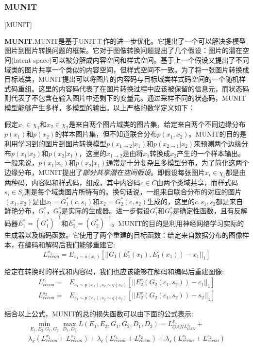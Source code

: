 
\subsubsection{MUNIT}[MUNIT]

\textbf{MUNIT.}\cite{MUNIT}\quad MUNIT是基于UNIT\cite{UNIT}工作的进一步优化。它提出了一个可以解决多模型图片到图片转换问题的框架。它对于图像转换问题提出了几个假设：图片的潜在空间(latent space)可以被分解成内容空间和样式空间。基于上一个假设又提出了不同域类的图片共享一个类似的内容空间，但样式空间不一致。为了将一张图片转换成目标域类，MUNIT提出可以将图片的内容码与目标域类样式码空间的一个随机样式码重组。这里的内容码代表了在图片转换过程中应该被保留的信息元，而状态码则代表了不包含在输入图片中还剩下的变量元。通过采样不同的状态码，MUNIT模型能够产生多样，多模型的输出。以上严格的数学定义如下：

假定$x_1\in \chi_1$和$x_2\in \chi_2$是来自两个图片域类的图片集，给定来自两个不同边缘分布$p(x_1)$和$p(x_2)$的样本图片集，但不知道联合分布$p(x_1, x_2)$。MUNIT的目的是利用学习到的图片到图片转换模型$p(x_{1\to 2}|x_1)$和$p(x_{2\to 1}|x_2)$来预测两个边缘分布$p(x_1|x_2)$和$p(x_2|x_1)$，这里的$x_{1\to 2}$是由将$x_1$转换成$x_2$产生的一个样本输出。一般来说，$p(x_1|x_2)$和$p(x_2|x_1)$通常是十分复杂且多模型分布，为了简化这两个边缘分布，MUNIT提出了\textit{部分共享潜在空间假设}。即假设每张图片$x_i\in \chi_i$都是由两种码，内容码和样式码，组成，其中内容码$c\in C$由两个类域共享，而样式码$s_i\in S_i$则是每个域类图片所特有的。换句话说，一组来自联合分布的对应的图片$(x_1, x_2)$是由$x_!=G_1^*(c,s_1)$和$x_2=G_2^*(c, s_2)$生成的，这里的$c,s_1,s_2$都是来自鲜艳分布，$G_1^*，G_2^*$是实际的生成器。进一步假设$G_1^*$和$G_2^*$是确定性函数，且有反解码器$E_1^*=(G_1^*)^{-1}$和$E_2^*=(G_2^*)^{-1}$。MUNIT的目的是利用神经网络学习实际的生成器以及编码函数。它使用了两个重建的目标函数：给定来自数据分布的图像样本，在编码和解码后我们能够重建它:
$$L_{recon}^{x_1}=E_{x_1\sim o(x_1)}[||G_1(E_1^c(x_1), E_1^s(x_1))-x_1||_1] $$

给定在转换时的样式和内容码，我们也应该能够在解码和编码后重建图像:
\begin{align*}
    L_{recon}^{c_1}= & E_{c_1\sim p(c_1), s_2\sim q(s_2)}[||E_2^c(G_2(c_1,s_2))-c_1||_1] \\
    L_{recon}^{s_2}= & E_{c_1\sim p(c_1), s_2\sim q(s_2)}[||E_2^s(G_2(c_1, s_2))-s_2||_1]
\end{align*}

结合以上公式，MUNIT的总的损失函数可以由下面的公式表示:
\begin{gather*}
\min_{E_1,E_2,G_1,G_2}\max_{D_1,D_2}L(E_1,E_2,G_1,G_2,D_1,D_2)=L_{GAN}^{x_1}_L_{GAN}^{x_2}+\\
\lambda_x(L_{recon}^{x_1}+L_{recon}^{x_2})+\lambda_c(L_{recon}^{c_1}+L_{recon}^{c_2})+\lambda_s(L_{recon}^{s_1}+L_{recon}^{s_2})
\end{gather*}

